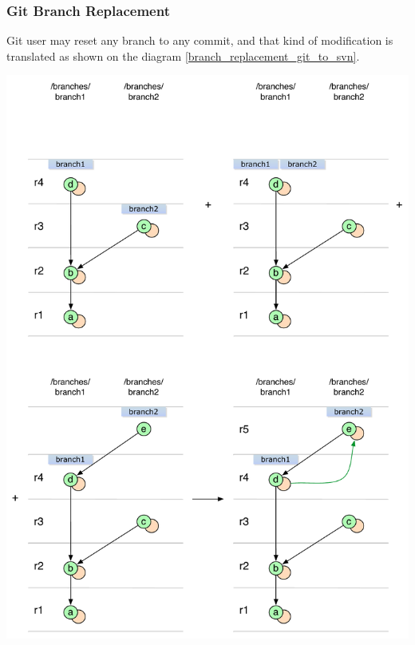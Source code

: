 \subsubsection{Git Branch Replacement}
Git user may reset any branch to any commit, and that kind of modification is translated as shown on the diagram \ref{branch_replacement_git_to_svn}.
\begin{center}
\includegraphics[width=\textwidth]{img/diagrams/branch_replacement_git_to_svn.pdf}%
\label{branch_replacement_git_to_svn}%
\end{center}
